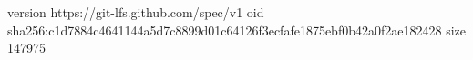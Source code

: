 version https://git-lfs.github.com/spec/v1
oid sha256:c1d7884c4641144a5d7c8899d01c64126f3ecfafe1875ebf0b42a0f2ae182428
size 147975
